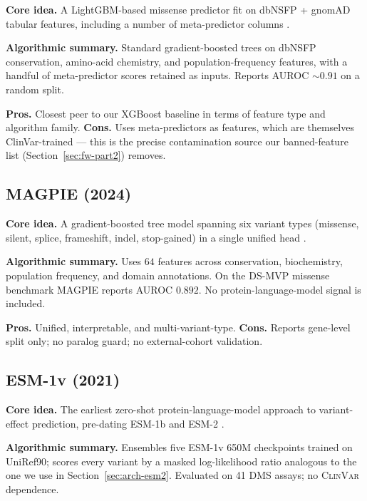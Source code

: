 \documentclass[11pt,a4paper,oneside]{report}
\begin{document}
\textbf{Core idea.} A LightGBM-based missense predictor fit on dbNSFP
+ gnomAD tabular features, including a number of meta-predictor
columns \citep{tong2023mvppt}.

\textbf{Algorithmic summary.} Standard gradient-boosted trees on
dbNSFP conservation, amino-acid chemistry, and population-frequency
features, with a handful of meta-predictor scores retained as
inputs. Reports AUROC $\sim$$0.91$ on a random split.

\textbf{Pros.} Closest peer to our XGBoost baseline in terms of
feature type and algorithm family. \textbf{Cons.} Uses
meta-predictors as features, which are themselves ClinVar-trained
--- this is the precise contamination source our banned-feature
list (Section~\ref{sec:fw-part2}) removes.

\subsection{MAGPIE (2024) \texorpdfstring{\citep{liu2024magpie}}{(Liu et al., 2024)}}
\label{sec:rw-magpie}

\textbf{Core idea.} A gradient-boosted tree model spanning six variant
types (missense, silent, splice, frameshift, indel, stop-gained) in a
single unified head \citep{liu2024magpie}.

\textbf{Algorithmic summary.} Uses $64$ features across conservation,
biochemistry, population frequency, and domain annotations. On the
DS-MVP missense benchmark MAGPIE reports AUROC $0.892$. No
protein-language-model signal is included.

\textbf{Pros.} Unified, interpretable, and multi-variant-type.
\textbf{Cons.} Reports gene-level split only; no paralog guard; no
external-cohort validation.

\subsection{ESM-1v (2021) \texorpdfstring{\citep{meier2021esm1v}}{(Meier et al., 2021)}}
\label{sec:rw-esm1v}

\textbf{Core idea.} The earliest zero-shot protein-language-model
approach to variant-effect prediction, pre-dating ESM-1b and ESM-2
\citep{meier2021esm1v}.

\textbf{Algorithmic summary.} Ensembles five ESM-1v 650M checkpoints
trained on UniRef90; scores every variant by a masked log-likelihood
ratio analogous to the one we use in
Section~\ref{sec:arch-esm2}. Evaluated on 41 DMS assays; no
\textsc{ClinVar} dependence.
\end{document}
